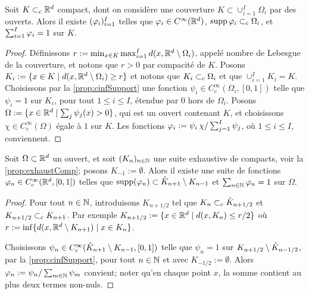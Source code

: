 \begin{proposition}
\label{prop:cinfPartition}
%
	Soit $K \subset_c \mathbb{R}^d$ compact, dont on considère une couverture $K \subset \cup_{i=1}^I \Omega_i$ par des ouverts. Alors il existe $(\varphi_i)_{i=1}^I$ telles que $\varphi_i \in C^\infty(\mathbb{R}^d)$, $\operatorname{supp} \varphi_i \subset_c \Omega_i$, et $\sum_{i=1}^I \varphi_i = 1$ sur $K$.
\end{proposition}

\begin{proof}
	Définissons $r := \min_{x \in K} \max_{i=1}^I d(x,\mathbb{R}^d \setminus \Omega_i)$, appelé nombre de Lebesgue de la couverture, et notons que $r>0$ par compacité de $K$.  Posons $K_i := \{x \in K \mid d(x,\mathbb{R}^d \setminus \Omega_i) \geq r\}$ et notons que $K_i \subset_c \Omega_i$ et que $\cup_{i=1}^I K_i = K$.
	Choisissons par la \cref{prop:cinfSupport} une fonction $\psi_i \in C^\infty_c(\Omega_i,[0,1])$ telle que $\psi_i=1$ sur $K_i$, pour tout $1 \leq i \leq I$, étendue par $0$ hors de $\Omega_i$. 
	Posons $\Omega := \{x\in \mathbb{R}^d \mid \sum_j \psi_j(x) > 0\}$, qui est un ouvert contenant $K$, et choisissons $\chi \in C^\infty_c(\Omega)$ égale à $1$ sur $K$.
	Les fonctions $\varphi_i := \psi_i\, \chi / \sum_{j=1}^I \psi_j$, où $1 \leq i \leq I$, conviennent. 
\end{proof}

\begin{proposition} 
\label{prop:cinfExhaust}
%
Soit $\Omega \subset \mathbb{R}^d$ un ouvert, et soit $(K_n)_{n \in \mathbb{N}}$ une suite exhaustive de compacts, voir la \cref{prop:exhaustComp}; posons $K_{-1} := \emptyset$.
Alors il existe une suite de fonctions $\varphi_n \in C^\infty_c(\mathbb{R}^d,[0,1])$ telles que $\operatorname{supp}(\varphi_n) \subset \mathring K_{n+1}\setminus K_{n-1}$ et $\sum_{n \in \mathbb{N}} \varphi_n = 1$ sur $\Omega$. 
\end{proposition}

\begin{proof}
Pour tout $n \in \mathbb{N}$, introduisons $K_{n+1/2}$ tel que $K_n \subset_c \mathring K_{n+1/2}$ et $K_{n+1/2} \subset_c K_{n+1}$. Par exemple $K_{n+1/2} := \{x \in \mathbb{R}^d \mid d(x,K_n) \leq r/2\}$ où $r := \inf \{d(x,\mathbb{R}^d \setminus K_{n+1}) \mid x \in K_n\}$. 

	Choisissons $\psi_n \in C^\infty_c(\mathring K_{n+1} \setminus  K_{n-1}, [0,1])$ telle que $\psi_n=1$ sur $K_{n+1/2}\setminus \mathring K_{n-1/2}$, par la \cref{prop:cinfSupport}, pour tout $n \in \mathbb{N}$ et avec $K_{-1/2} := \emptyset$. 
	Alors $\varphi_n := \psi_n / \sum_{m \in \mathbb{N}} \psi_m$ convient; noter qu'en chaque point $x$, la somme contient au plus deux termes non-nuls. 
\end{proof}
